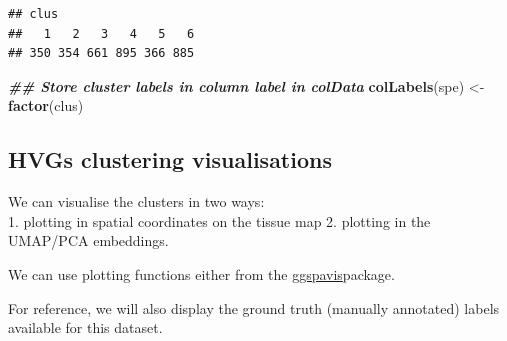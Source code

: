 \documentclass[
]{book}
\newenvironment{Shaded}{\begin{snugshade}}{\end{snugshade}}
\newcommand{\AttributeTok}[1]{\textcolor[rgb]{0.13,0.29,0.53}{#1}}
\newcommand{\DecValTok}[1]{\textcolor[rgb]{0.00,0.00,0.81}{#1}}
\newcommand{\DocumentationTok}[1]{\textcolor[rgb]{0.56,0.35,0.01}{\textbf{\textit{#1}}}}
\newcommand{\FunctionTok}[1]{\textcolor[rgb]{0.13,0.29,0.53}{\textbf{#1}}}
\newcommand{\NormalTok}[1]{#1}
\newcommand{\OtherTok}[1]{\textcolor[rgb]{0.56,0.35,0.01}{#1}}
\newcommand{\SpecialCharTok}[1]{\textcolor[rgb]{0.81,0.36,0.00}{\textbf{#1}}}
\newcommand{\StringTok}[1]{\textcolor[rgb]{0.31,0.60,0.02}{#1}}
\begin{document}
\begin{Shaded}
\end{Shaded}

\begin{verbatim}
## clus
##   1   2   3   4   5   6 
## 350 354 661 895 366 885
\end{verbatim}

\begin{Shaded}
\begin{Highlighting}[]
\DocumentationTok{\#\# Store cluster labels in column \textquotesingle{}label\textquotesingle{} in colData}
\FunctionTok{colLabels}\NormalTok{(spe) }\OtherTok{\textless{}{-}} \FunctionTok{factor}\NormalTok{(clus)}
\end{Highlighting}
\end{Shaded}

\hypertarget{hvgs-clustering-visualisations}{%
\subsection{HVGs clustering visualisations}\label{hvgs-clustering-visualisations}}

We can visualise the clusters in two ways:\\
1. plotting in spatial coordinates on the tissue map
2. plotting in the UMAP/PCA embeddings.

We can use plotting functions either from the \href{https://bioconductor.org/packages/ggspavis}{ggspavis}package.

For reference, we will also display the ground truth (manually annotated) labels available for this dataset.
\end{document}
